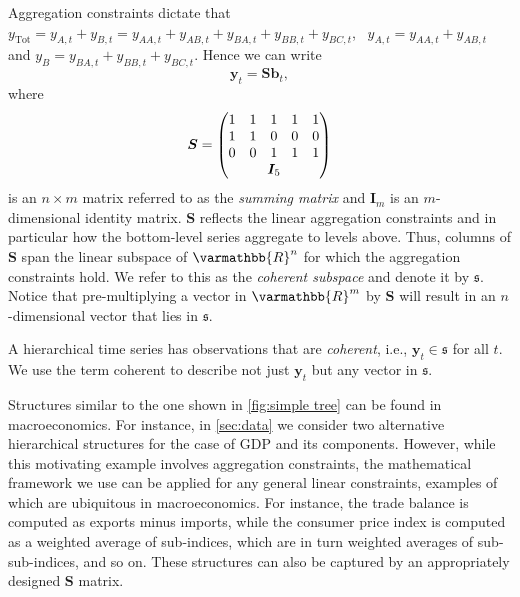 \documentclass[graybox]{svmult}
\begin{document}
Aggregation constraints dictate that $y_{\text{Tot}}=y_{A,t}+y_{B,t}=y_{AA,t}+y_{AB,t}+y_{BA,t}+y_{BB,t}+y_{BC,t}$,~ $y_{A,t}=y_{AA,t}+y_{AB,t}$ and $y_{B}=y_{BA,t}+y_{BB,t}+y_{BC,t}$. Hence we can write
\begin{equation}\label{eq:summing matrix}
	\bm{y}_t = \bm{Sb}_t,
\end{equation}
where \begin{equation*}
	\bm{S} = \begin{pmatrix}
		1 & 1                            & 1 & 1 & 1 \\
		1 & 1                            & 0 & 0 & 0 \\
		0 & 0                            & 1 & 1 & 1 \\
		  & \multicolumn{3}{c}{\bm{I}_5} &
	\end{pmatrix}
\end{equation*}
is an $n\times m$ matrix referred to as the \textit{summing matrix} and $\bm{I}_m$ is an $m$-dimensional identity matrix. $\bm{S}$ reflects the linear aggregation constraints and in particular how the bottom-level series aggregate to levels above. Thus, columns of $\bm{S}$ span the linear subspace of $\varmathbb{R}^n$ for which the aggregation constraints hold. We refer to this as the \textit{coherent subspace} and denote it by $\mathfrak{s}$. Notice that pre-multiplying a vector in $\varmathbb{R}^m$ by $\bm{S}$ will result in an $n$-dimensional vector that lies in $\mathfrak{s}$.

\begin{property}
	A hierarchical time series has observations that are \textit{coherent}, i.e., $\bm{y}_{t} \in \mathfrak{s}$ for all $t$. We use the term coherent to describe not just $\bm{y}_t$ but any vector in $\mathfrak{s}$.
	\label{prop:coherence}
\end{property}

Structures similar to the one shown in \autoref{fig:simple tree} can be found in macroeconomics. For instance, in \autoref{sec:data} we consider two alternative hierarchical structures for the case of GDP and its components. However, while this motivating example involves aggregation constraints, the mathematical framework we use can be applied for any general linear constraints, examples of which are ubiquitous in macroeconomics. For instance, the trade balance is computed as exports minus imports, while the consumer price index is computed as a weighted average of sub-indices, which are in turn weighted averages of sub-sub-indices, and so on. These structures can also be captured by an appropriately designed $\bm{S}$ matrix.
\end{document}
